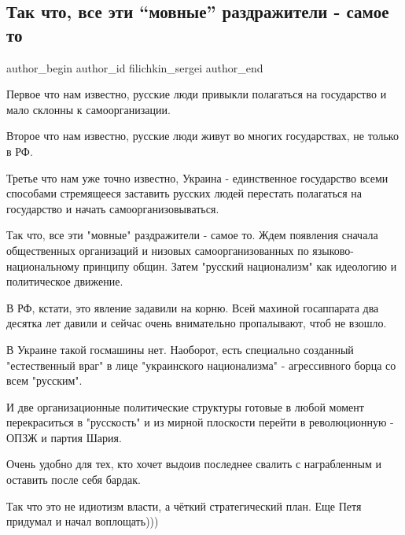 
 
 
 
 
\subsection{Так что, все эти \enquote{мовные} раздражители - самое то}
\ifcmt
  author_begin
   author_id filichkin_sergei
  author_end
\fi

Первое что нам известно, русские люди привыкли полагаться на государство и мало склонны к самоорганизации.

Второе что нам известно, русские люди живут во многих государствах, не только в РФ.

Третье что нам уже точно известно, Украина - единственное государство всеми
способами стремящееся заставить русских людей перестать полагаться на
государство и начать самоорганизовываться.

Так что, все эти "мовные" раздражители - самое то. Ждем появления сначала
общественных организаций и низовых самоорганизованных по языково-национальному
принципу общин. Затем "русский национализм" как идеологию и политическое
движение.

В РФ, кстати, это явление задавили на корню. Всей махиной госаппарата два
десятка лет давили и сейчас очень внимательно пропалывают, чтоб не взошло.

В Украине такой госмашины нет. Наоборот, есть специально созданный
"естественный враг" в лице "украинского национализма" - агрессивного борца со
всем "русским".

И две организационные политические структуры готовые в любой момент
перекраситься в "русскость" и из мирной плоскости перейти в революционную -
ОПЗЖ и партия Шария.

Очень удобно для тех, кто хочет выдоив последнее свалить с награбленным и
оставить после себя бардак.

Так что это не идиотизм власти, а чёткий стратегический план. Еще Петя придумал
и начал воплощать)))
